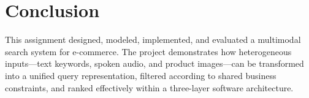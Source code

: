 \documentclass[12pt,a4paper]{article}
\begin{document}


\FloatBarrier
\section{Conclusion}\label{sec:conclusion}
This assignment designed, modeled, implemented, and evaluated a multimodal search system for e-commerce. The project demonstrates how heterogeneous inputs—text keywords, spoken audio, and product images—can be transformed into a unified query representation, filtered according to shared business constraints, and ranked effectively within a three-layer software architecture.
\end{document}
